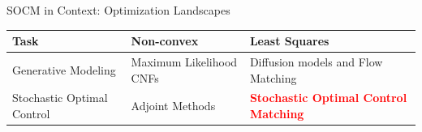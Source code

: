 \documentclass[aspectratio=169,xcolor=dvipsnames]{beamer}
\begin{document}
\begin{frame}{SOCM in Context: Optimization Landscapes}
    \vspace{0.5cm}
    \begin{table}
        \centering
        \begin{tabular}{>{\centering\arraybackslash}p{}>{\centering\arraybackslash}p{}>{\centering\arraybackslash}p{}}
            \toprule
            \textbf{Task} & \textbf{Non-convex} & \textbf{Least Squares} \\
            \midrule
            Generative Modeling & Maximum Likelihood CNFs & Diffusion models and Flow Matching \\
            Stochastic Optimal Control & Adjoint Methods & \textcolor{red}{\textbf{Stochastic Optimal Control Matching}} \\
            \bottomrule
        \end{tabular}
    \end{table}
\end{frame}

\end{document}
